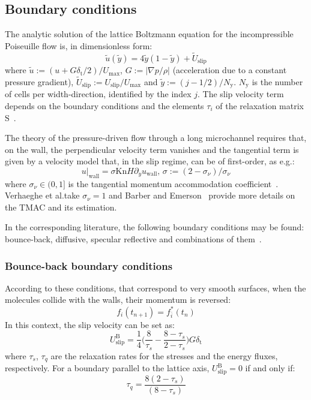 \subsection{Boundary conditions}
The analytic solution of the lattice Boltzmann equation for the incompressible Poiseuille flow
is, in dimensionless form:
\begin{equation}
 \tilde{u}(\tilde{y}) = 4\tilde{y}(1-\tilde{y}) + \tilde{U}_\mathrm{slip}
\end{equation}
where $\tilde{u} := (u + G\delta_\mathrm{t} / 2) / U_\mathrm{max}$,
$G := |\nabla p / \rho|$ (acceleration due to a constant pressure gradient),
$\tilde{U}_\mathrm{slip} := U_\mathrm{slip} / U_\mathrm{max}$
and $\tilde{y} := (j-1/2)/N_\mathrm{y}$. $N_\mathrm{y}$ is the number of cells per width-direction,
identified by the index $j$. The slip velocity term depends on the boundary
conditions and the elements $\tau_i$ of the relaxation matrix $\mathrm{S}$~\cite{Verhaeghe2009}.

The theory of the pressure-driven flow through a long microchannel requires that, on the wall,
the perpendicular velocity term vanishes and the tangential term is given by a velocity model
that, in the slip regime, can be of first-order, as e.g.:
\begin{equation}
 u|_\mathrm{wall} = \sigma \mathrm{Kn} H \partial_y u_\mathrm{wall} \textrm{, \ } \sigma := (2 - \sigma_\nu)/\sigma_\nu 
 \label{eq:slip_1order}
\end{equation}
where $\sigma_\nu \in (0,1]$ is the tangential momentum accommodation coefficient~\cite{Verhaeghe2009}. 
Verhaeghe et al.\@ take $\sigma_\nu = 1$ and Barber and Emerson~\cite{Barber2006} provide more details on the TMAC and its estimation. 

In the corresponding literature, the following boundary conditions may be found:
bounce-back, diffusive, specular reflective and combinations of them~\cite{Verhaeghe2009}.

\subsubsection{Bounce-back boundary conditions}
According to these conditions, that correspond to very smooth surfaces, when the molecules collide with the walls, their
momentum is reversed:
\begin{equation}
 f_i(t_{n+1}) = f_{\bar{i}}^*(t_n)
\end{equation}
In this context, the slip velocity can be set as:
\begin{equation}
 U_\mathrm{slip}^\mathrm{B} = \frac{1}{4} \Big(\frac{8}{\tau_s} - \frac{8-\tau_s}{2-\tau_s} \Big) G \delta_\mathrm{t}
\end{equation}
where $\tau_s$, $\tau_q$ are the relaxation rates for the stresses and the energy fluxes, respectively.
For a boundary parallel to the lattice axis, $U_\mathrm{slip}^\mathrm{B} = 0$ if
and only if:
\begin{equation}
 \tau_q = \frac{8(2-\tau_s)}{(8-\tau_s)}
\end{equation}

